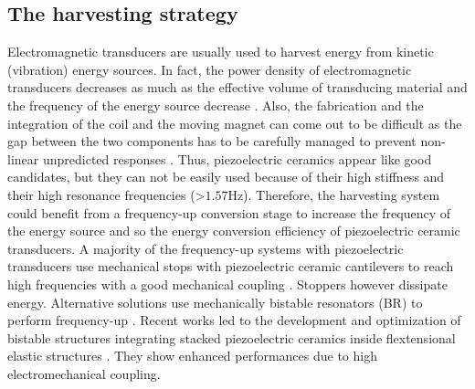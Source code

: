 \documentclass[3p,twocolumn,preprint]{elsarticle}
\begin{document}
	\subsection{The harvesting strategy}	
	\label{The harvesting strategy}
Electromagnetic transducers are usually used to harvest energy from kinetic (vibration) energy sources. In fact, the power density of electromagnetic transducers decreases as much as the effective volume of transducing material and the frequency of the energy source decrease \cite{Priya2017,Kulah2008}. Also, the fabrication and the integration of the coil and the moving magnet can come out to be difficult as the gap between the two components has to be carefully managed to prevent non-linear unpredicted responses \cite{Caruntu2001}. Thus, piezoelectric ceramics appear like good candidates, but they can not be easily used because of their high stiffness and their high resonance frequencies (>$1.57$Hz). Therefore, the harvesting system could benefit from a frequency-up conversion stage \cite{Ashraf2011,Peng2021} to increase the frequency of the energy source and so the energy conversion efficiency of piezoelectric ceramic transducers. A majority of the frequency-up systems with piezoelectric transducers use mechanical stops with piezoelectric ceramic cantilevers to reach high frequencies with a good mechanical coupling \cite{Edwards2013,Gu2011,Lee2007}. Stoppers however dissipate energy. Alternative solutions use mechanically bistable resonators (BR) to perform frequency-up \cite{Vocca2012}. Recent works led to the development and optimization of  bistable structures integrating stacked piezoelectric ceramics inside flextensional elastic structures \cite{Huguet2017}. They show enhanced performances due to high electromechanical coupling.
\end{document}

